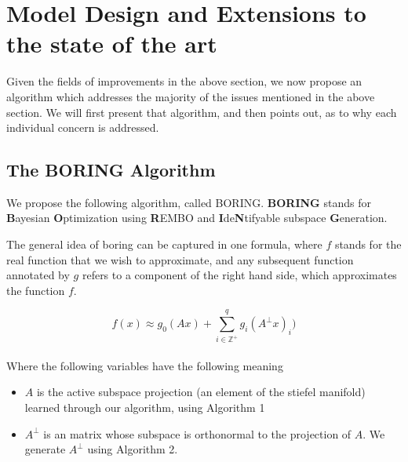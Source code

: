 \chapter{Model Design and Extensions to the state of the art}

\ifpdf
    \graphicspath{{Chapter4/Figs/Raster/}{Chapter4/Figs/PDF/}{Chapter4/Figs/}}
\else
    \graphicspath{{Chapter4/Figs/Vector/}{Chapter4/Figs/}}
\fi

Given the fields of improvements in the above section, we now propose an algorithm which addresses the majority of the issues mentioned in the above section.
We will first present that algorithm, and then points out, as to why each individual concern is addressed.

\section{The BORING Algorithm}

We propose the following algorithm, called BORING. \textbf{BORING} stands for \textbf{B}ayesian \textbf{O}ptimization using \textbf{R}EMBO and \textbf{I}de\textbf{N}tifyable subspace \textbf{G}eneration.

The general idea of boring can be captured in one formula, where $f$ stands for the real function that we wish to approximate, and any subsequent function annotated by $g$ refers to a component of the right hand side, which approximates the function $f$.

\begin{equation}
f(x) \approx g_0(A x) + \sum_{i \in \mathbb{Z}^+}^{q} g_i( A^{\bot} x)_i )
\label{eq:dimRedEquation}
\end{equation} \\

Where the following variables have the following meaning
\begin{itemize}
\item $A$ is the active subspace projection (an element of the stiefel manifold) learned through our algorithm, using Algorithm 1
\item $A^{\bot}$ is an matrix whose subspace is orthonormal to the projection of $A$.
We generate $A^{\bot}$ using Algorithm 2.
\end{itemize}

